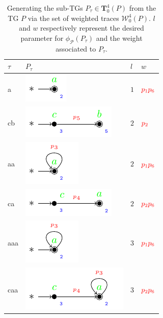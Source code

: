 \begin{table}[!t]
	\caption{Generating the sub-TGs $P_\tau\in \mathbf{T}_0^4(P)$ from the TG $P$ via the set of weighted traces $\mathcal{W}_0^4(P)$. $l$ and $w$ respectively represent the desired parameter for $\phi_{\mathcal{P}}(P_\tau)$ and the weight associated to $P_\tau$.}\label{tab:proj}
	\centering
	\begin{tabular}{>{\centering\arraybackslash} m{1cm}| >{\centering\arraybackslash} m{4cm} >{\centering\arraybackslash} m{1cm} >{\centering\arraybackslash} m{1cm} }
		\toprule
		$\tau$&$P_\tau$&$l$&$w$\\
		\midrule
		a & \includegraphics{images/trace_a} & $1$ & $\color{red}p_1p_6$\\
		cb & \includegraphics{images/trace_cb} & $2$ & $\color{red}p_2$\\
		aa & \includegraphics{images/trace_a_loop} & $2$ & $\color{red}p_1p_6$\\
		ca & \includegraphics{images/trace_ca} & $2$ & $\color{red}p_2p_6$\\
		aaa & \includegraphics{images/trace_a_loop} & $3$ & $\color{red}p_1p_6$\\
		caa & \includegraphics{images/trace_ca_loop} & $3$ & $\color{red}p_2p_6$\\

\end{tabular}
\end{table}
